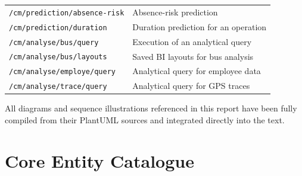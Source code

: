 \begin{longtable}{>{\raggedright\arraybackslash}p{6.5cm}p{8cm}}
\texttt{/cm/prediction/absence-risk} & Absence-risk prediction \\
\texttt{/cm/prediction/duration} & Duration prediction for an operation \\
\texttt{/cm/analyse/bus/query} & Execution of an analytical query \\
\texttt{/cm/analyse/bus/layouts} & Saved BI layouts for bus analysis \\
\texttt{/cm/analyse/employe/query} & Analytical query for employee data \\
\texttt{/cm/analyse/trace/query} & Analytical query for GPS traces \\
\end{longtable}

All diagrams and sequence illustrations referenced in this report have been fully compiled from their PlantUML sources and integrated directly into the text.

\normalsize

\section{Core Entity Catalogue}

